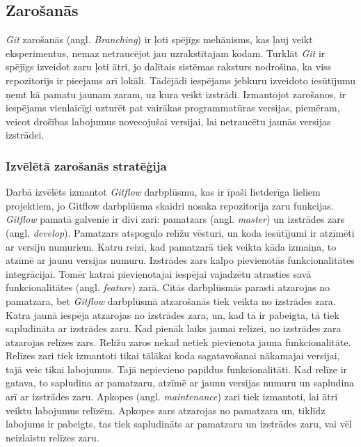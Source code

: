 \subsection{Zarošanās} \label{Branching}
\textit{Git} zarošanās (angl. \textit{Branching}) ir ļoti spējīgs mehānisms, kas ļauj veikt eksperimentus, nemaz netraucējot jau uzrakstītajam kodam. Turklāt \textit{Git} ir spējīgs izveidot zaru ļoti ātri, jo dalītais sistēmas raksturs nodrošina, ka viss repozitorijs ir pieejams arī lokāli. Tādējādi iespējams jebkuru izveidoto iesūtījumu ņemt kā pamatu jaunam zaram, uz kura veikt izstrādi. Izmantojot zarošanos, ir iespējams vienlaicīgi uzturēt pat vairākas programmatūras versijas, piemēram, veicot drošības labojumus novecojušai versijai, lai netraucētu jaunās versijas izstrādei.
\subsubsection{Izvēlētā zarošanās stratēģija}
Darbā izvēlēts izmantot  \textit{Gitflow} darbplūsmu, kas ir īpaši lietderīga lieliem projektiem, jo Gitflow darbplūsma skaidri nosaka repozitorija zaru funkcijas.  \textit{Gitflow} pamatā galvenie ir divi zari: pamatzars (angl. \textit{master}) un izstrādes zars (angl. \textit{develop}). Pamatzars atspoguļo relīžu vēsturi, un koda iesūtījumi ir atzīmēti ar versiju numuriem. Katru reizi, kad pamatzarā tiek veikta kāda izmaiņa, to atzīmē ar jaunu versijas numuru. Izstrādes zars kalpo pievienotās funkcionalitātes integrācijai. Tomēr katrai pievienotajai iespējai vajadzētu atrasties savā funkcionalitātes (angl. \textit{feature}) zarā. Citās darbplūsmās parasti atzarojas no pamatzara, bet  \textit{Gitflow} darbplūsmā atzarošanās tiek veikta no izstrādes zara. Katra jaunā iespēja atzarojas no izstrādes zara, un, kad tā ir pabeigta, tā tiek sapludināta ar izstrādes zaru.
Kad pienāk laiks jaunai relīzei, no izstrādes zara atzarojas relīzes zars. Relīžu zaros nekad netiek pievienota jauna funkcionalitāte. Relīzes zari tiek  izmantoti tikai tālākai koda sagatavošanai nākamajai versijai, tajā veic tikai labojumus. Tajā nepievieno papildus funkcionalitāti. Kad relīze ir gatava, to sapludina ar pamatzaru, atzīmē ar jaunu versijas numuru un sapludina arī ar izstrādes zaru.
Apkopes (angl. \textit{maintenance}) zari tiek izmantoti, lai ātri veiktu labojumus relīzēm. Apkopes zars atzarojas no pamatzara un, tiklīdz labojums ir pabeigts, tas tiek sapludināts ar pamatzaru un izstrādes zaru, vai vēl neizlaistu relīzes zaru.

